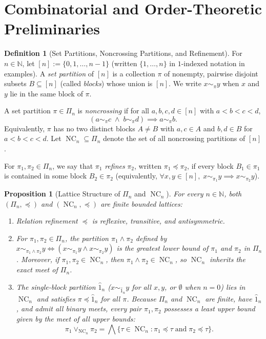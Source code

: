 \documentclass[11pt]{article}
\newtheorem{proposition}[theorem]{Proposition}
\theoremstyle{definition}
\newtheorem{definition}[theorem]{Definition}
\newcommand{\NC}{\operatorname{NC}}
\begin{document}
\section{Combinatorial and Order-Theoretic Preliminaries}

\begin{definition}[Set Partitions, Noncrossing Partitions, and Refinement]\label{def:nc}
For $n \in \mathbb{N}$, let $[n] := \{0, 1, \dots, n-1\}$ (written $\{1, \dots, n\}$ in
$1$-indexed notation in examples). A \emph{set partition} of $[n]$ is a collection $\pi$
of nonempty, pairwise disjoint subsets $B \subseteq [n]$ (called \emph{blocks}) whose
union is $[n]$. We write $x \sim_\pi y$ when $x$ and $y$ lie in the same block of $\pi$.

A set partition $\pi \in \Pi_n$ is \emph{noncrossing} if for all $a, b, c, d \in [n]$
with $a < b < c < d$,
\begin{equation}\label{eq:nc}
  (a \sim_\pi c \;\land\; b \sim_\pi d) \implies a \sim_\pi b.
\end{equation}
Equivalently, $\pi$ has no two distinct blocks $A \ne B$ with $a, c \in A$ and
$b, d \in B$ for $a < b < c < d$. Let $\NC_n \subseteq \Pi_n$ denote the set of all
noncrossing partitions of $[n]$.

For $\pi_1, \pi_2 \in \Pi_n$, we say that $\pi_1$ \emph{refines} $\pi_2$, written
$\pi_1 \preceq \pi_2$, if every block $B_1 \in \pi_1$ is contained in some block
$B_2 \in \pi_2$ (equivalently, $\forall x, y \in [n],\; x \sim_{\pi_1} y \implies
x \sim_{\pi_2} y$).
\end{definition}

\begin{proposition}[Lattice Structure of $\Pi_n$ and $\NC_n$]\label{prop:lattice}
For every $n \in \mathbb{N}$, both $(\Pi_n, \preceq)$ and $(\NC_n, \preceq)$ are finite
bounded lattices:
\begin{enumerate}
  \item Relation refinement $\preceq$ is reflexive, transitive, and antisymmetric.
  \item For $\pi_1, \pi_2 \in \Pi_n$, the partition $\pi_1 \wedge \pi_2$ defined by
  $x \sim_{\pi_1 \wedge \pi_2} y \iff (x \sim_{\pi_1} y \land x \sim_{\pi_2} y)$ is the
  greatest lower bound of $\pi_1$ and $\pi_2$ in $\Pi_n$. Moreover, if $\pi_1, \pi_2 \in
  \NC_n$, then $\pi_1 \wedge \pi_2 \in \NC_n$, so $\NC_n$ inherits the exact meet of
  $\Pi_n$.
  \item The single-block partition $\hat{1}_n$ ($x \sim_{\hat{1}_n} y$ for all $x, y$,
  or $\emptyset$ when $n = 0$) lies in $\NC_n$ and satisfies $\pi \preceq \hat{1}_n$ for
  all $\pi$. Because $\Pi_n$ and $\NC_n$ are finite, have $\hat{1}_n$, and admit all
  binary meets, every pair $\pi_1, \pi_2$ possesses a least upper bound given by the
  meet of all upper bounds:
  \[
    \pi_1 \vee_{\NC_n} \pi_2
    = \bigwedge \{\tau \in \NC_n : \pi_1 \preceq \tau \;\text{and}\; \pi_2 \preceq \tau\}.
  \]
\end{enumerate}
\end{proposition}
\end{document}
